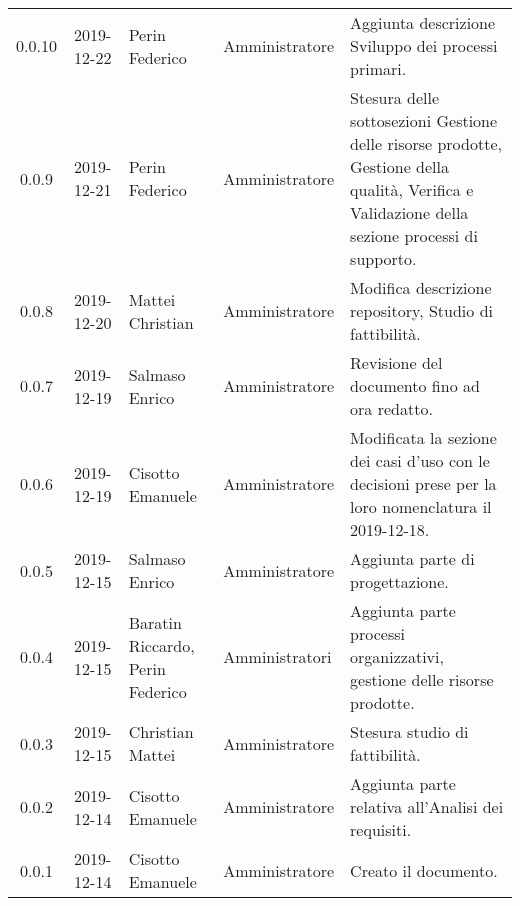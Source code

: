 {\begin{longtable}{c c  C{4cm}  C{3cm} C{4cm}}
0.0.10 & 2019-12-22 & Perin Federico  & Amministratore & Aggiunta descrizione Sviluppo dei processi primari. \\

0.0.9 & 2019-12-21 & Perin Federico & Amministratore & Stesura delle sottosezioni Gestione delle risorse prodotte, Gestione della qualità, Verifica e Validazione della sezione processi di supporto. \\

0.0.8 & 2019-12-20 & Mattei Christian & Amministratore & Modifica descrizione repository, Studio di fattibilità. \\

0.0.7 & 2019-12-19 & Salmaso Enrico & Amministratore & Revisione del documento fino ad ora redatto. \\

0.0.6 & 2019-12-19 & Cisotto Emanuele & Amministratore & Modificata la sezione dei casi d’uso con le decisioni prese per la loro nomenclatura il 2019-12-18. \\

0.0.5 & 2019-12-15 & Salmaso Enrico & Amministratore & Aggiunta parte di progettazione. \\

0.0.4 & 2019-12-15 & Baratin Riccardo, Perin Federico  & Amministratori & Aggiunta parte processi organizzativi, gestione delle risorse prodotte. \\

0.0.3 & 2019-12-15 & Christian Mattei & Amministratore & Stesura studio di fattibilità. \\

0.0.2 & 2019-12-14 & Cisotto Emanuele & Amministratore & Aggiunta parte relativa all’Analisi dei requisiti. \\

0.0.1 & 2019-12-14 & Cisotto Emanuele & Amministratore & Creato il documento. \\
		
\end{longtable}
}